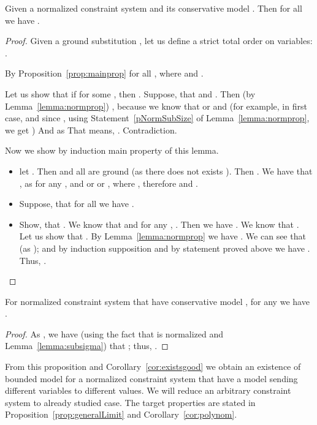 \begin{lemma}\label{lemma:subsigma}
	Given a normalized constraint system  and its conservative model . Then for all  we have .
\begin{proof}
	Given a ground substitution , let us define a  strict total order on variables: .
	
	By Proposition~\ref{prop:mainprop} for all  , where    and . 

Let us show that if  for some , then .
	Suppose, that  and . 
	Then  
	(by Lemma~\ref{lemma:normprop}) 
	 \br ,  
	because we know that  or  and  
	(for example, in first case,  \br  and   \br  since , 
	  using Statement~\ref{pNormSubSize} of Lemma~\ref{lemma:normprop}, 
	  we get   \br   )
	And as  
	That means, . Contradiction.
	
	Now we show by induction main property of this lemma.
	\begin{itemize}
		\item let . \br 
		Then  and 
		 all  \br are ground  (as there does not exists ). 
		Then .
 We have that , 
as for any ,  and  or  or , where , therefore   
and 
.

		\item
			Suppose, that for all  we have \br  .
		
		\item
			Show, that .
			We know that  
			and for any  , .
			Then we have  \br . We know that . Let us show that .
			By Lemma~\ref{lemma:normprop} 
we have  \br  \br . We can see that   (as  \br ); and by induction supposition and by statement proved above we have 
			 \br . \br
			Thus, .

	\end{itemize}

\end{proof}

\end{lemma}



\begin{prop}\label{prop:limit}
	For normalized constraint system  that have conservative  model , 
	for any  we have .
\begin{proof}
	As , we have (using the fact that  is normalized and  Lemma~\ref{lemma:subsigma}) 
	that  ;
thus, .
\end{proof}

\end{prop}

From this proposition and Corollary~\ref{cor:existsgood} we obtain an existence of bounded model 
for a normalized constraint system 
that have a model sending different variables to different values.
We will reduce an arbitrary constraint system to already studied case. 
The target properties are stated in Proposition~\ref{prop:generalLimit} and Corollary~\ref{cor:polynom}.

